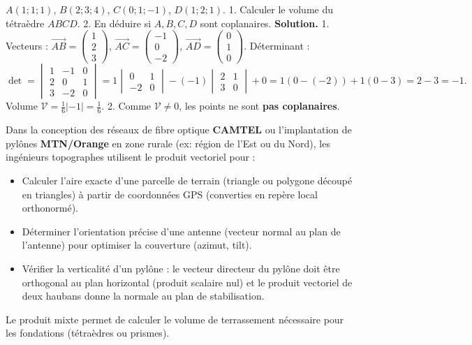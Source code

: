 \documentclass[11pt]{article}
\begin{document}
\begin{exoresolu}
$A(1;1;1)$, $B(2;3;4)$, $C(0;1;-1)$, $D(1;2;1)$.
1. Calculer le volume du tétraèdre $ABCD$.
2. En déduire si $A,B,C,D$ sont coplanaires.
\tcblower
\textbf{Solution.}
1. Vecteurs :
$\overrightarrow{AB}=\begin{pmatrix}1\\2\\3\end{pmatrix}$,
$\overrightarrow{AC}=\begin{pmatrix}-1\\0\\-2\end{pmatrix}$,
$\overrightarrow{AD}=\begin{pmatrix}0\\1\\0\end{pmatrix}$.
Déterminant :
\[
\det = \begin{vmatrix}
1 & -1 & 0 \\
2 & 0 & 1 \\
3 & -2 & 0
\end{vmatrix}
= 1\begin{vmatrix}0&1\\-2&0\end{vmatrix} - (-1)\begin{vmatrix}2&1\\3&0\end{vmatrix} + 0
= 1(0 - (-2)) + 1(0 - 3) = 2 - 3 = -1.
\]
Volume $\mathcal{V} = \frac{1}{6}|-1| = \frac{1}{6}$.
2. Comme $\mathcal{V}\neq 0$, les points ne sont \textbf{pas coplanaires}.
\end{exoresolu}

\begin{savaistu}
Dans la conception des réseaux de fibre optique \textbf{CAMTEL} ou l'implantation de pylônes \textbf{MTN/Orange} en zone rurale (ex: région de l'Est ou du Nord), les ingénieurs topographes utilisent le produit vectoriel pour :
\begin{itemize}
  \item Calculer l'aire exacte d'une parcelle de terrain (triangle ou polygone découpé en triangles) à partir de coordonnées GPS (converties en repère local orthonormé).
  \item Déterminer l'orientation précise d'une antenne (vecteur normal au plan de l'antenne) pour optimiser la couverture (azimut, tilt).
  \item Vérifier la verticalité d'un pylône : le vecteur directeur du pylône doit être orthogonal au plan horizontal (produit scalaire nul) et le produit vectoriel de deux haubans donne la normale au plan de stabilisation.
\end{itemize}
Le produit mixte permet de calculer le volume de terrassement nécessaire pour les fondations (tétraèdres ou prismes).
\end{savaistu}
\end{document}
